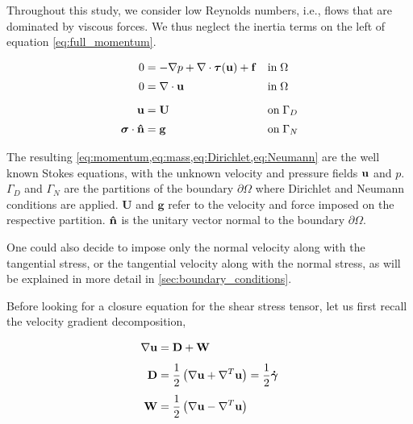 \documentclass[11 pt]{report}
\begin{document}
Throughout this study, we consider low Reynolds numbers, i.e., flows that are dominated by viscous forces. We thus neglect the inertia terms on the left of equation \eqref{eq:full_momentum}. 
\begin{empheqboxed}
    \begin{align}
        0 &= -\nabla p + \nabla \cdot \boldsymbol \tau(\mathbf{u}) + \mathbf{f} &&\text{in} \; \Omega \label{eq:momentum} \\[2pt]
        0 &= \nabla \cdot \mathbf{u} &&\text{in}\; \Omega \label{eq:mass}\\[6pt]
        \mathbf{u} &= \mathbf{U} &&\text{on}\; \Gamma_{D} \label{eq:Dirichlet}\\[2pt]
        \boldsymbol \sigma \cdot \mathbf{\hat n} &= \mathbf{g} &&\text{on}\; \Gamma_{N} \label{eq:Neumann}
    \end{align}
\end{empheqboxed}
The resulting \cref{eq:momentum,eq:mass,eq:Dirichlet,eq:Neumann} are the well known Stokes equations, with the unknown velocity and pressure fields $\mathbf{u}$ and $p$. $\Gamma_D$ and $\Gamma_N$ are the partitions of the boundary $\partial \Omega$ where Dirichlet and Neumann conditions are applied. $\mathbf{U}$ and $\mathbf{g}$ refer to the velocity and force imposed on the respective partition. $\mathbf{\hat n}$ is the unitary vector normal to the boundary $\partial \Omega$.

One could also decide to impose only the normal velocity along with the tangential stress, or the tangential velocity along with the normal stress, as will be explained in more detail in \cref{sec:boundary_conditions}.

Before looking for a closure equation for the shear stress tensor, let us first recall the velocity gradient decomposition,
\begin{empheqboxed}
    \begin{align}
        \nabla \mathbf{u} &= \mathbf{D} + \mathbf{W}\\[4pt]
        \mathbf{D} &= \frac{1}{2} \left(\nabla \mathbf{u} + \nabla^T \mathbf{u}\right) = \frac{1}{2} \boldsymbol{\dot \gamma}\\[4pt]
        \mathbf{W} &= \frac{1}{2} \left(\nabla \mathbf{u} - \nabla^T \mathbf{u}\right)
    \end{align}
\end{empheqboxed}
\end{document}
